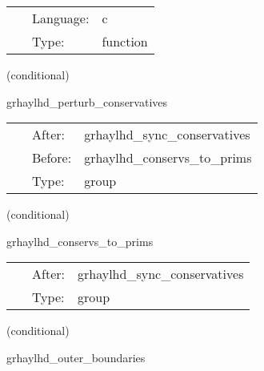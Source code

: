 \documentclass{article}
\begin{document}
 \begin{tabular*}{160mm}{cll} 
~ & Language:  & c \\ 
~ & Type:  & function \\ 
\end{tabular*} 


\vspace{5mm}

   (conditional) 

\hspace{5mm} grhaylhd\_perturb\_conservatives 

\hspace{5mm}{\it perturb conservatives before con2prim } 


\hspace{5mm}

 \begin{tabular*}{160mm}{cll} 
~ & After:  & grhaylhd\_sync\_conservatives \\ 
~ & Before:  & grhaylhd\_conservs\_to\_prims \\ 
~ & Type:  & group \\ 
\end{tabular*} 


\vspace{5mm}

   (conditional) 

\hspace{5mm} grhaylhd\_conservs\_to\_prims 

\hspace{5mm}{\it compute primitive variables from conservatives } 


\hspace{5mm}

 \begin{tabular*}{160mm}{cll} 
~ & After:  & grhaylhd\_sync\_conservatives \\ 
~ & Type:  & group \\ 
\end{tabular*} 


\vspace{5mm}

   (conditional) 

\hspace{5mm} grhaylhd\_outer\_boundaries 

\hspace{5mm}{\it apply selected boundary conditions to the primitive variables } 
\end{document}
